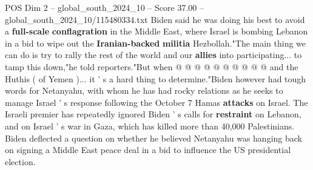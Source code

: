 \begin{textsample}{POS Dim 2 – global\_south\_2024\_10 – Score 37.00 – global\_south\_2024\_10/115480334.txt}
Biden said he was doing his best to avoid a \textbf{full-scale} \textbf{conflagration} in the Middle East, where Israel is bombing Lebanon in a bid to wipe out the \textbf{Iranian-backed} \textbf{militia} Hezbollah."The main thing we can do is try to rally the rest of the world and our \textbf{allies} into participating... to tamp this down,"he told reporters."But when @ @ @ @ @ @ @ @ @ @ and the Huthis ( of Yemen )... it ' s a hard thing to determine."Biden however had tough words for Netanyahu, with whom he has had rocky relations as he seeks to manage Israel ' s response following the October 7 Hamas \textbf{attacks} on Israel.
The Israeli premier has repeatedly ignored Biden ' s calls for \textbf{restraint} on Lebanon, and on Israel ' s war in Gaza, which has killed more than 40,000 Palestinians.
Biden deflected a question on whether he believed Netanyahu was hanging back on signing a Middle East peace deal in a bid to influence the US presidential election.

\end{textsample}
